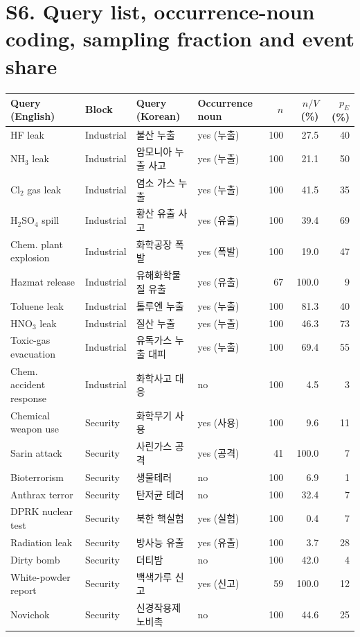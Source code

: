 \documentclass[11pt]{article}
\begin{document}
\section*{S6. Query list, occurrence-noun coding, sampling fraction and event share}
{\footnotesize\setlength{\tabcolsep}{3pt}
\begin{tabular}{llllrrr}\toprule Query (English) & Block & Query (Korean) & Occurrence noun & $n$ & $n/V$ (\%) & $p_E$ (\%) \\\midrule
HF leak & Industrial & 불산 누출 & yes (누출) & 100 & 27.5 & 40 \\
NH$_3$ leak & Industrial & 암모니아 누출 사고 & yes (누출) & 100 & 21.1 & 50 \\
Cl$_2$ gas leak & Industrial & 염소 가스 누출 & yes (누출) & 100 & 41.5 & 35 \\
H$_2$SO$_4$ spill & Industrial & 황산 유출 사고 & yes (유출) & 100 & 39.4 & 69 \\
Chem. plant explosion & Industrial & 화학공장 폭발 & yes (폭발) & 100 & 19.0 & 47 \\
Hazmat release & Industrial & 유해화학물질 유출 & yes (유출) & 67 & 100.0 & 9 \\
Toluene leak & Industrial & 톨루엔 누출 & yes (누출) & 100 & 81.3 & 40 \\
HNO$_3$ leak & Industrial & 질산 누출 & yes (누출) & 100 & 46.3 & 73 \\
Toxic-gas evacuation & Industrial & 유독가스 누출 대피 & yes (누출) & 100 & 69.4 & 55 \\
Chem. accident response & Industrial & 화학사고 대응 & no & 100 & 4.5 & 3 \\
Chemical weapon use & Security & 화학무기 사용 & yes (사용) & 100 & 9.6 & 11 \\
Sarin attack & Security & 사린가스 공격 & yes (공격) & 41 & 100.0 & 7 \\
Bioterrorism & Security & 생물테러 & no & 100 & 6.9 & 1 \\
Anthrax terror & Security & 탄저균 테러 & no & 100 & 32.4 & 7 \\
DPRK nuclear test & Security & 북한 핵실험 & yes (실험) & 100 & 0.4 & 7 \\
Radiation leak & Security & 방사능 유출 & yes (유출) & 100 & 3.7 & 28 \\
Dirty bomb & Security & 더티밤 & no & 100 & 42.0 & 4 \\
White-powder report & Security & 백색가루 신고 & yes (신고) & 59 & 100.0 & 12 \\
Novichok & Security & 신경작용제 노비촉 & no & 100 & 44.6 & 25 \\

\end{tabular}}
\end{document}

